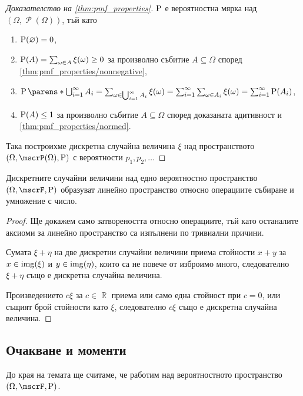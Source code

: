 \documentclass{../../common/topic}
\begin{document}
\begin{proof}[Доказателство на \cref{thm:pmf_properties}]
  \( \operatorname{P} \) е вероятностна мярка над \( (\Omega, \mscrP(\Omega)) \), тъй като
  \begin{enumerate}
    \item \( \operatorname{P}(\varnothing) = 0 \),
    \item \( \operatorname{P}(A) = \sum_{\omega \in A} \xi(\omega) \geq 0 \) за произволно събитие \( A \subseteq \Omega \) според \ref{thm:pmf_properties/nonnegative},
    \item \( \Prob\parens*{\bigcup_{i=1}^\infty A_i} = \sum_{\omega \in \bigcup_{i=1}^\infty A_i} \xi(\omega) = \sum_{i=1}^\infty \sum_{\omega \in A_i} \xi(\omega) = \sum_{i=1}^\infty \Prob(A_i) \),
    \item \( \operatorname{P}(A) \leq 1 \) за произволно събитие \( A \subseteq \Omega \) според доказаната адитивност и \ref{thm:pmf_properties/normed}.
  \end{enumerate}
  Така построихме дискретна случайна величина \( \xi \) над пространството \( (\Omega, \mscrP(\Omega), \Prob) \) с вероятности \( p_1, p_2, \ldots \)
\end{proof}

\begin{proposition}
  Дискретните случайни величини над едно вероятностно пространство \( (\Omega, \mscrF, \Prob) \) образуват линейно пространство относно операциите събиране и умножение с число.
\end{proposition}
\begin{proof}
  Ще докажем само затвореността относно операциите, тъй като останалите аксиоми за линейно пространство са изпълнени по тривиални причини.

  Сумата \( \xi + \eta \) на две дискретни случайни величини приема стойности \( x + y \) за \( x \in \operatorname{img}(\xi) \) и \( y \in \operatorname{img}(\eta) \), които са не повече от изброимо много, следователно \( \xi + \eta \) също е дискретна случайна величина.

  Произведението \( c \xi \) за \( c \in \BbbR \) приема или само една стойност при \( c = 0 \), или същият брой стойности като \( \xi \), следователно \( c \xi \) също е дискретна случайна величина.
\end{proof}

\subsection{Очакване и моменти}

До края на темата ще считаме, че работим над вероятностното пространство \( (\Omega, \mscrF, \Prob) \).
\end{document}

